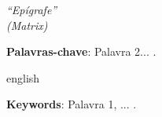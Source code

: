 \documentclass[
	12pt,				%
	openright,			%
	twoside,			%
	a4paper,			%
	chapter=TITLE,		%
	sumario=abnt-6027-2012,
	english,			%
	brazil				%
	]{UFVJM-abntex2}
\begin{document}

\begin{resumo}[agradecimentos]
\setlength{\parskip}{\onelineskip}  %


\setlength{\parskip}{0.cm}  %
\end{resumo}


\begin{epigrafe}
    \vspace*{\fill}
	\begin{flushright}
		\textit{``Epígrafe''\\
		(Matrix)}
	\end{flushright}
\end{epigrafe}


\begin{resumo}[RESUMO]

\noindent 

\vspace{\onelineskip}
\noindent \textbf{Palavras-chave}: Palavra 2... .
\end{resumo}

\begin{resumo}[ABSTRACT]
 \begin{otherlanguage*}{english}
   \noindent 

   \vspace{\onelineskip}

   \noindent 
   \textbf{Keywords}: Palavra 1, ... .
 \end{otherlanguage*}
\end{resumo}
\vfill

% 

%  
\end{document}
